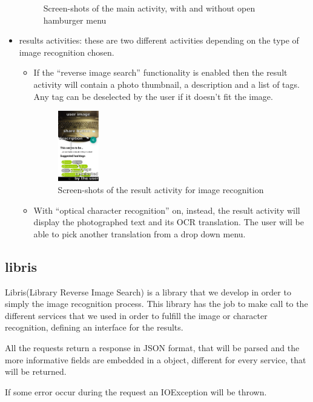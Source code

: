 \begin{itemize}
\begin{figure}[h]
        \caption{Screen-shots of the main activity, with and without open 
                 hamburger menu}
        \label{fig:splash}
    \end{figure}
  \item results activities: these are two different activities depending on
    the type of image recognition chosen.
    \begin{itemize}
     \item If the ``reverse image search'' functionality is enabled then the
result activity will contain a photo thumbnail, a description and a list of
tags. Any tag can be deselected by the user if it doesn't fit the image.
    \begin{figure}[h]
        \centering
        \includegraphics[width=0.18\textwidth]{../img/image_result_activity}
        \caption{Screen-shots of the result activity for image recognition}
        \label{fig:splash}
    \end{figure}
     \item With ``optical character recognition'' on, instead, the result
activity will display the photographed text and its OCR translation. The user
will be able to pick another translation from a drop down menu.
    \end{itemize}
\end{itemize}

\subsection{libris}
Libris(Library Reverse Image Search) is a library that we develop in order to 
simply the image recognition process. This library has the job to make call to 
the different services that we used in order to fulfill the image or character 
recognition, defining an interface for the results.

All the requests return a response in JSON format, that will be parsed and the 
more informative fields are embedded in a object, different for every service, 
that will be returned. 

If some error occur during the request an IOException will be thrown.


